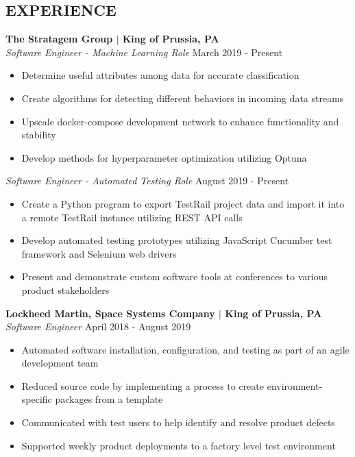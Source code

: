 \documentclass[line,resmargin,11pt]{res}
\begin{document}
\begin{resume}
\section{EXPERIENCE}
\textbf{The Stratagem Group $|$ King of Prussia, PA} \\
{\sl Software Engineer - Machine Learning Role} \hfill March 2019 - Present
	\begin{itemize} \itemsep -2pt %
		\item Determine useful attributes among data for accurate classification
		\item Create algorithms for detecting different behaviors in incoming data streams
		\item Upscale docker-compose development network to enhance functionality and stability
		\item Develop methods for hyperparameter optimization utilizing Optuna
	\end{itemize}

{\sl Software Engineer - Automated Testing Role} \hfill August 2019 - Present
	\begin{itemize} \itemsep -2pt %
		\item Create a Python program to export TestRail project data and import it into a remote TestRail instance utilizing REST API calls
		\item Develop automated testing prototypes utilizing JavaScript Cucumber test framework and Selenium web drivers
		\item Present and demonstrate custom software tools at conferences to various product stakeholders
	\end{itemize}

\textbf{Lockheed Martin, Space Systems Company $|$ King of Prussia, PA} \\
{\sl Software Engineer} \hfill April 2018 - August 2019 
	\begin{itemize}  \itemsep -2pt %
		\item Automated software installation, configuration, and testing as part of an agile development team
		\item Reduced source code by implementing a process to create environment-specific packages from a template
		\item Communicated with test users to help identify and resolve product defects
		\item Supported weekly product deployments to a factory level test environment
	\end{itemize}
	

\end{resume}
\end{document}
